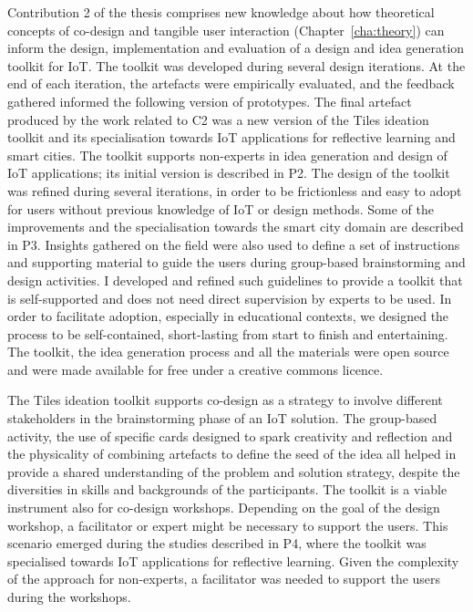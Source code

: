 Contribution 2 of the thesis comprises new knowledge about how theoretical concepts of co-design and tangible user interaction (Chapter~\ref{cha:theory}) can inform the design, implementation and evaluation of a design and idea generation toolkit for IoT. The toolkit was developed during several design iterations. At the end of each iteration, the artefacts were empirically evaluated, and the feedback gathered informed the following version of prototypes. The final artefact produced by the work related to C2 was a new version of the Tiles ideation toolkit and its specialisation towards IoT applications for reflective learning and smart cities. The toolkit supports non-experts in idea generation and design of IoT applications; its initial version is described in P2. The design of the toolkit was refined during several iterations, in order to be frictionless and easy to adopt for users without previous knowledge of IoT or design methods. Some of the improvements and the specialisation towards the smart city domain are described in P3. Insights gathered on the field were also used to define a set of instructions and supporting material to guide the users during group-based brainstorming and design activities. I developed and refined such guidelines to provide a toolkit that is self-supported and does not need direct supervision by experts to be used. In order to facilitate adoption, especially in educational contexts, we designed the process to be self-contained, short-lasting from start to finish and entertaining. The toolkit, the idea generation process and all the materials were open source and were made available for free under a creative commons licence.

The Tiles ideation toolkit supports co-design as a strategy to involve different stakeholders in the brainstorming phase of an IoT solution. The group-based activity, the use of specific cards designed to spark creativity and reflection and the physicality of combining artefacts to define the seed of the idea all helped in provide a shared understanding of the problem and solution strategy, despite the diversities in skills and backgrounds of the participants. The toolkit is a viable instrument also for co-design workshops. Depending on the goal of the design workshop, a facilitator or expert might be necessary to support the users. This scenario emerged during the studies described in P4, where the toolkit was specialised towards IoT applications for reflective learning. Given the complexity of the approach for non-experts, a facilitator was needed to support the users during the workshops.

